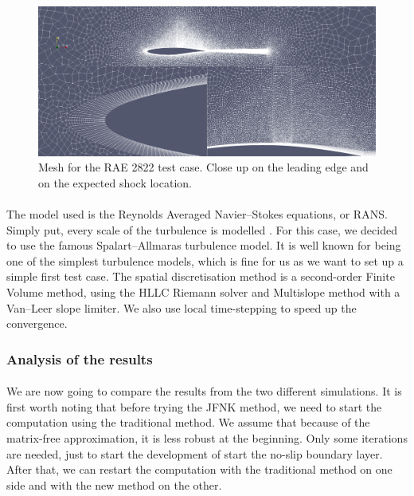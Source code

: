         \begin{figure}
          \centering
          \includegraphics[width=\textwidth]{figures/rae_mesh.png}
          \caption{Mesh for the RAE 2822 test case. Close up on the leading edge and on the expected shock location.}
          \label{fig:rae_mesh}
        \end{figure}

        \paragraph{}
        The model used is the Reynolds Averaged Navier--Stokes equations, or RANS.
        Simply put, every scale of the turbulence is modelled .
        For this case, we decided to use the famous Spalart--Allmaras turbulence model.
        It is well known for being one of the simplest turbulence models, which is fine for us as we want to set up a simple first test case.
        The spatial discretisation method is a second-order Finite Volume method, using the HLLC Riemann solver and Multislope method with a Van--Leer slope limiter.
        We also use local time-stepping to speed up the convergence.


      \subsubsection{Analysis of the results}


        \paragraph{}
        We are now going to compare the results from the two different simulations.
        It is first worth noting that before trying the JFNK method, we need to start the computation using the traditional method.
        We assume that because of the matrix-free approximation, it is less robust at the beginning.
        Only some iterations are needed, just to start the development of start the no-slip boundary layer.
        After that, we can restart the computation with the traditional method on one side and with the new method on the other.

